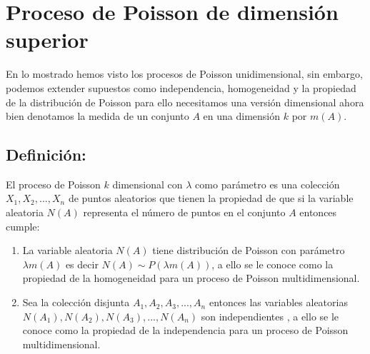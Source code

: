 \documentclass{article}
\begin{document}
\section{Proceso de Poisson de dimensión superior}

En lo mostrado hemos visto los procesos de Poisson unidimensional, sin embargo, podemos extender supuestos como independencia, homogeneidad y la propiedad de la distribución de Poisson para ello necesitamos una versión dimensional ahora bien denotamos la medida de un conjunto $A$ en una dimensión $k$ por $m(A)$.

\subsection{Definición:}
El proceso de Poisson $k$ dimensional con $\lambda$ como parámetro es una colección $X_1,X_2,...,X_n$ de puntos aleatorios que tienen la propiedad de que si la variable aleatoria $N(A)$ representa el número de puntos en el conjunto $A$ entonces cumple:

\begin{enumerate}
	\item La variable aleatoria $N(A)$ tiene distribución de Poisson con parámetro $\lambda m(A)$ es decir $N(A)\sim P(\lambda m(A))$, a ello se le conoce como la propiedad de la homogeneidad para un proceso de Poisson multidimensional.
	\item Sea la colección disjunta $A_1,A_2,A_3,...,A_n$ entonces las variables aleatorias $N(A_1),N(A_2),N(A_3),..., N(A_n)$ son independientes , a ello se le conoce como la propiedad de la independencia para un proceso de Poisson multidimensional.
\end{enumerate}
\end{document}
